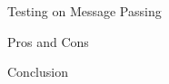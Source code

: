 \documentclass[notes xcolor=dvipsnames]{beamer}
\begin{document}
    \begin{frame}{Testing on Message Passing}

        \begin{figure}
        \end{figure}

        \begin{figure}
        \end{figure}

        
    \end{frame}

    \begin{frame}{Pros and Cons}
        \begin{figure}
        \end{figure}
        
    \end{frame}

    \begin{frame}{Conclusion}

    \end{frame}
\end{document}
